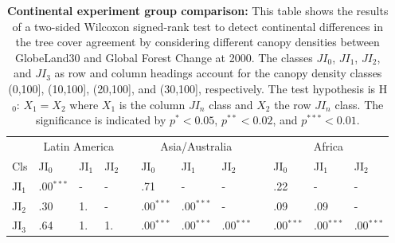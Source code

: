			\begin{table}[ht]
				\centering
				\caption[Continental experiment group comparison]{\textbf{Continental experiment group comparison:} This table shows the results of a two-sided Wilcoxon signed-rank test to detect continental differences in the tree cover agreement by considering different canopy densities between GlobeLand30 and Global Forest Change at 2000. The classes $JI_0$, $JI_1$, $JI_2$, and $JI_3$ as row and column headings account for the canopy density classes (0,100], (10,100], (20,100], and (30,100], respectively. The test hypothesis is H$_0$: $X_1=X_2$ where $X_1$ is the column $JI_n$ class and $X_2$ the row $JI_n$ class. The significance is indicated by $p^{*}<0.05$, $p^{**}<0.02$, and $p^{***}<0.01$.}
				\label{tab:wilcoxontwosided_regions}
				\begin{tabular}{llllllllllll}
					\hline
					& \multicolumn{3}{c}{Latin America} && \multicolumn{3}{c}{Asia/Australia} && \multicolumn{3}{c}{Africa} \\\cline{2-4}\cline{6-8}\cline{10-12}
					Cls & JI$_0$ & JI$_1$ & JI$_2$ && JI$_0$ & JI$_1$ & JI$_2$ && JI$_0$ & JI$_1$ & JI$_2$ \\\hline
					JI$_1$ & .00$^{***}$ & - & - && .71 & - & - && .22 & - & - \\
					JI$_2$ & .30 & 1. & - && .00$^{***}$ & .00$^{***}$ & - && .09 & .09  & - \\
					JI$_3$ & .64 & 1. & 1. && .00$^{***}$ & .00$^{***}$ & .00$^{***}$ && .00$^{***}$ & .00$^{***}$ & .00$^{***}$ \\\hline
				\end{tabular}
			\end{table}
